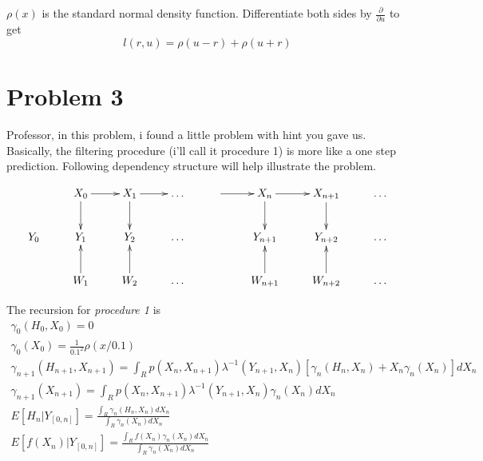 \documentclass[a4paper,10pt]{article}
\begin{document}
$\rho(x)$ is the standard normal density function. Differentiate both sides by $\frac{\partial}{\partial u}$ to get
\begin{equation}
l(r,u) = \rho(u-r) + \rho(u+r) \nonumber
\end{equation}


\section{Problem 3}
Professor, in this problem, i found a little problem with hint you gave us. Basically, the filtering procedure (i'll call it procedure 1) is more like a one step prediction. Following dependency structure will help illustrate the problem.

\begin{equation} \label{prob3_depend}
\xymatrix{  & X_0 \ar[d] \ar[r] & X_1 \ar[d] \ar[r] & \ldots & \ar[r] & X_n \ar[d] \ar[r] & X_{n+1} \ar[d] & \ldots \\
        Y_0 & Y_1               & Y_2               & \ldots &        & Y_{n+1}           & Y_{n+2}        & \ldots \\
            & W_1 \ar[u]        & W_2 \ar[u]        & \ldots &        & W_{n+1} \ar[u]    & W_{n+2} \ar[u] &\ldots \\ }
\end{equation}

The recursion for \emph{procedure 1} is
\begin{eqnarray}
\gamma_0(H_0, X_0) = 0  \\
\gamma_0(X_0) = \frac{1}{0.1^2}\rho(x/0.1)  \\
\gamma_{n+1}(H_{n+1}, X_{n+1}) = \int_R p(X_n, X_{n+1}) \lambda^{-1}(Y_{n+1}, X_{n})[\gamma_n(H_n, X_n) + X_n \gamma_n(X_n)]dX_n  \\
\gamma_{n+1}(X_{n+1}) = \int_R p(X_n, X_{n+1}) \lambda^{-1}(Y_{n+1}, X_{n})\gamma_n(X_n)dX_n  \\
E[H_n|Y_{[0,n]}] = \frac{\int_R \gamma_n(H_n, X_n) dX_n}{\int_R \gamma_n(X_n)dX_n} \\
E[f(X_n) | Y_{[0,n]}] = \frac{\int_R f(X_n)\gamma_n(X_n)dX_n }{\int_R \gamma_n(X_n)dX_n}
\end{eqnarray}
\end{document}
